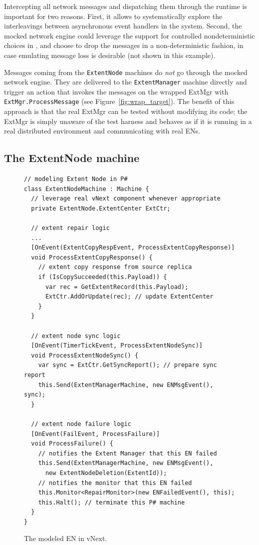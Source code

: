 Intercepting all network messages and dispatching them through the \psharp runtime is important for two reasons. First, it allows \psharp to systematically explore the interleavings between asynchronous event handlers in the system. Second, the mocked network engine could leverage the support for controlled nondeterministic choices in \psharp, and choose to drop the messages in a non-deterministic fashion, in case emulating message loss is desirable (not shown in this example).

Messages coming from the \texttt{ExtentNode} machines do \emph{not} go through the mocked network engine. They are delivered to the \texttt{ExtentManager} machine directly and trigger an action that invokes the messages on the wrapped ExtMgr with \texttt{ExtMgr.ProcessMessage} (see Figure~\ref{fig:wrap_target}). The benefit of this approach is that the real ExtMgr can be tested without modifying its code; the ExtMgr is simply unaware of the \psharp test harness and behaves as if it is running in a real distributed environment and communicating with real ENs.

\subsection{The ExtentNode machine}
\label{sec:method:mock_en}

\begin{figure}[t]
\begin{lstlisting}
// modeling Extent Node in P#
class ExtentNodeMachine : Machine {
  // leverage real vNext component whenever appropriate
  private ExtentNode.ExtentCenter ExtCtr;

  // extent repair logic
  ...
  [OnEvent(ExtentCopyRespEvent, ProcessExtentCopyResponse)]
  void ProcessExtentCopyResponse() {
    // extent copy response from source replica
    if (IsCopySucceeded(this.Payload)) {
      var rec = GetExtentRecord(this.Payload);
      ExtCtr.AddOrUpdate(rec); // update ExtentCenter
    }
  }

  // extent node sync logic
  [OnEvent(TimerTickEvent, ProcessExtentNodeSync)]
  void ProcessExtentNodeSync() {
    var sync = ExtCtr.GetSyncReport(); // prepare sync report
    this.Send(ExtentManagerMachine, new ENMsgEvent(), sync);
  }
  
  // extent node failure logic
  [OnEvent(FailEvent, ProcessFailure)]
  void ProcessFailure() {
    // notifies the Extent Manager that this EN failed
    this.Send(ExtentManagerMachine, new ENMsgEvent(),
      new ExtentNodeDeletion(ExtentId));
    // notifies the monitor that this EN failed
    this.Monitor<RepairMonitor>(new ENFailedEvent(), this);
    this.Halt(); // terminate this P# machine
  }
}
\end{lstlisting}
\vspace{-4mm}
\caption{The modeled EN in vNext.}
\label{fig:mocked_en}
\vspace{-2mm}
\end{figure}

